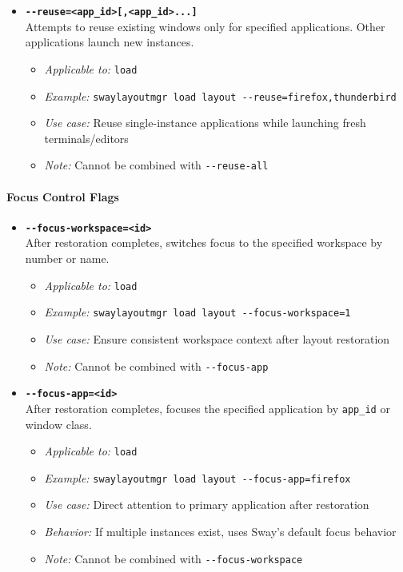 \begin{itemize}
    \item \textbf{\texttt{-{}-reuse=<app\_id>[,<app\_id>...]}} \\
    Attempts to reuse existing windows only for specified applications. Other applications launch new instances.
    \begin{itemize}
        \item \textit{Applicable to:} \texttt{load}
        \item \textit{Example:} \texttt{swaylayoutmgr load layout -{}-reuse=firefox,thunderbird}
        \item \textit{Use case:} Reuse single-instance applications while launching fresh terminals/editors
        \item \textit{Note:} Cannot be combined with \texttt{-{}-reuse-all}
    \end{itemize}
\end{itemize}

\paragraph{Focus Control Flags}

\begin{itemize}
    \item \textbf{\texttt{-{}-focus-workspace=<id>}} \\
    After restoration completes, switches focus to the specified workspace by number or name.
    \begin{itemize}
        \item \textit{Applicable to:} \texttt{load}
        \item \textit{Example:} \texttt{swaylayoutmgr load layout -{}-focus-workspace=1}
        \item \textit{Use case:} Ensure consistent workspace context after layout restoration
        \item \textit{Note:} Cannot be combined with \texttt{-{}-focus-app}
    \end{itemize}

    \item \textbf{\texttt{-{}-focus-app=<id>}} \\
    After restoration completes, focuses the specified application by \texttt{app\_id} or window class.
    \begin{itemize}
        \item \textit{Applicable to:} \texttt{load}
        \item \textit{Example:} \texttt{swaylayoutmgr load layout -{}-focus-app=firefox}
        \item \textit{Use case:} Direct attention to primary application after restoration
        \item \textit{Behavior:} If multiple instances exist, uses Sway's default focus behavior
        \item \textit{Note:} Cannot be combined with \texttt{-{}-focus-workspace}
    \end{itemize}
\end{itemize}

